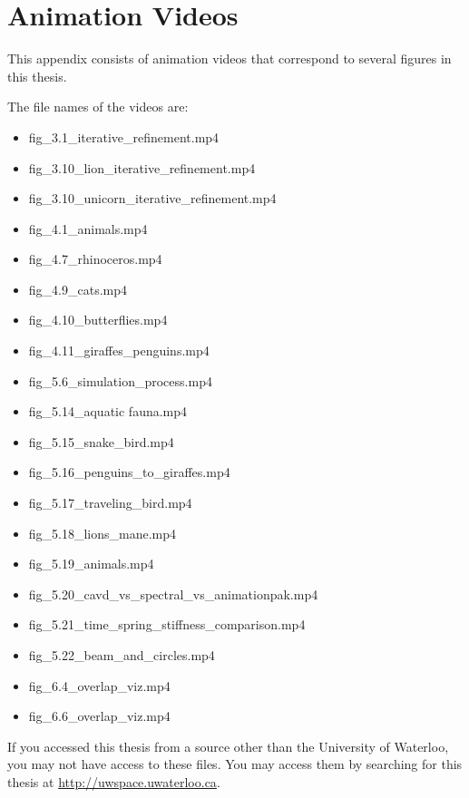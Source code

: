\chapter[Animation Videos]{Animation Videos}
\label{AppendixA}

This appendix consists of animation videos that correspond to several figures in this thesis.

The file names of the videos are:


\begin{itemize}
 \item fig\_3.1\_iterative\_refinement.mp4
 \item fig\_3.10\_lion\_iterative\_refinement.mp4
 \item fig\_3.10\_unicorn\_iterative\_refinement.mp4
 \item fig\_4.1\_animals.mp4
 \item fig\_4.7\_rhinoceros.mp4
 \item fig\_4.9\_cats.mp4
 \item fig\_4.10\_butterflies.mp4
 \item fig\_4.11\_giraffes\_penguins.mp4
 \item fig\_5.6\_simulation\_process.mp4
 \item fig\_5.14\_aquatic fauna.mp4
 \item fig\_5.15\_snake\_bird.mp4
 \item fig\_5.16\_penguins\_to\_giraffes.mp4
 \item fig\_5.17\_traveling\_bird.mp4
 \item fig\_5.18\_lions\_mane.mp4
 \item fig\_5.19\_animals.mp4
 \item fig\_5.20\_cavd\_vs\_spectral\_vs\_animationpak.mp4
 \item fig\_5.21\_time\_spring\_stiffness\_comparison.mp4
 \item fig\_5.22\_beam\_and\_circles.mp4
 \item fig\_6.4\_overlap\_viz.mp4
 \item fig\_6.6\_overlap\_viz.mp4
\end{itemize}


If you accessed this thesis from a source other than the University of Waterloo, you may not have
access to these files. You may access them by searching for this thesis at \href{http://uwspace.uwaterloo.ca}{http://uwspace.uwaterloo.ca}.